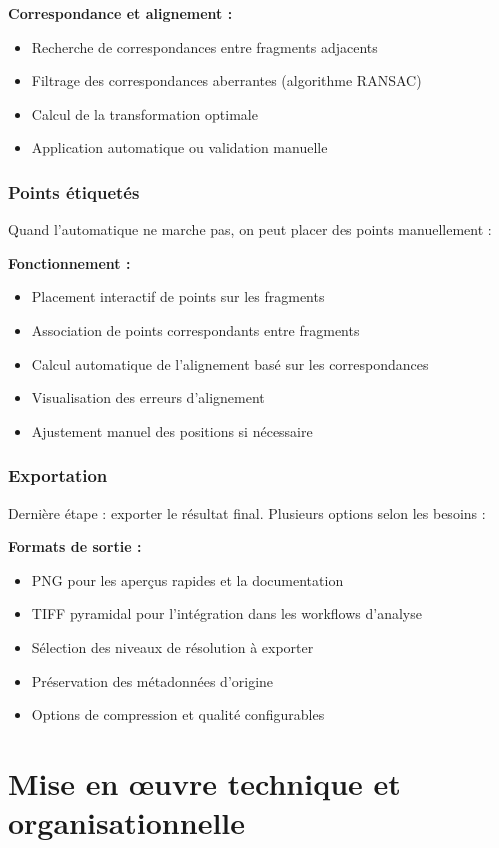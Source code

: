 \documentclass[11pt,a4paper]{report}
\begin{document}
\textbf{Correspondance et alignement :}
\begin{itemize}
\item Recherche de correspondances entre fragments adjacents
\item Filtrage des correspondances aberrantes (algorithme RANSAC)
\item Calcul de la transformation optimale
\item Application automatique ou validation manuelle
\end{itemize}

\subsubsection{Points étiquetés}

Quand l'automatique ne marche pas, on peut placer des points manuellement :

\textbf{Fonctionnement :}
\begin{itemize}
\item Placement interactif de points sur les fragments
\item Association de points correspondants entre fragments
\item Calcul automatique de l'alignement basé sur les correspondances
\item Visualisation des erreurs d'alignement
\item Ajustement manuel des positions si nécessaire
\end{itemize}

\subsubsection{Exportation}

Dernière étape : exporter le résultat final. Plusieurs options selon les besoins :

\textbf{Formats de sortie :}
\begin{itemize}
\item PNG pour les aperçus rapides et la documentation
\item TIFF pyramidal pour l'intégration dans les workflows d'analyse
\item Sélection des niveaux de résolution à exporter
\item Préservation des métadonnées d'origine
\item Options de compression et qualité configurables
\end{itemize}

\section{Mise en œuvre technique et organisationnelle}
\end{document}
